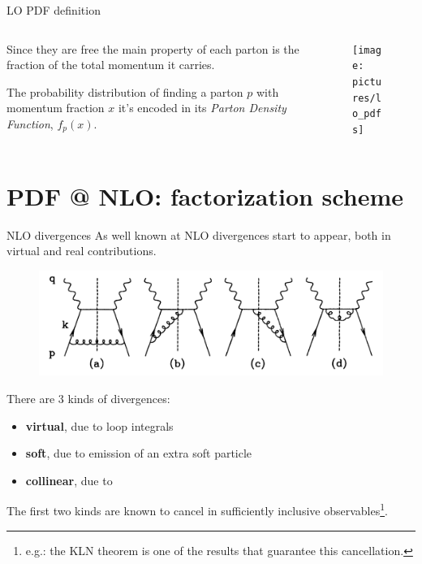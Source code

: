 \documentclass[9pt]{beamer}
\begin{document}
\begin{frame}{LO PDF definition}
    \begin{columns}
        \begin{column}{0.55\textwidth}
            Since they are free the main property of each parton is the
            fraction of the total momentum it carries.\newline

            The probability distribution of finding a parton $p$ with momentum
            fraction $x$ it's encoded in its \textit{Parton Density Function}\footnotemark,
            $f_p(x)$.
        \end{column}
        \begin{column}{0.45\textwidth}
            \begin{figure}
                \centering
                \texttt{[image: pictures/lo\_pdfs]}
            \end{figure}
        \end{column}
    \end{columns}
\end{frame}

\section{PDF @ NLO: factorization scheme}
\begin{frame}{NLO divergences}
    As well known at NLO divergences start to appear, both in virtual and real contributions.
    \begin{figure}
        \centering
        \includegraphics[width=.8\textwidth]{pictures/nlo-real}
    \end{figure}
    There are 3 kinds of divergences:
    \begin{itemize}
        \item \textbf{virtual}, due to loop integrals
        \item \textbf{soft}, due to emission of an extra soft particle
        \item \textbf{collinear}, due to
    \end{itemize}
    The first two kinds are known to cancel in sufficiently inclusive
    observables\footnote{e.g.: the KLN theorem is one of the results that guarantee
    this cancellation.}.
\end{frame}
\end{document}
